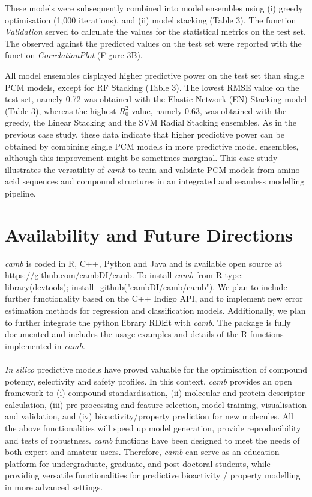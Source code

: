 \documentclass[twoside,a4wide,10pt]{article}
\begin{document}
These models were subsequently combined into model ensembles using
(i) greedy optimisation (1,000 iterations), and (ii) model stacking (Table 3).
The function {\it Validation} served to calculate the values for the statistical metrics on the test set.
The observed against the predicted values on the test set 
were reported with the function {\it CorrelationPlot} (Figure 3B).

All model ensembles displayed higher predictive power on the test set
than single PCM models, except for RF Stacking (Table 3).
The lowest RMSE value on the test set, namely 0.72 was obtained 
with the Elastic Network (EN) Stacking model (Table 3),
whereas the highest $R^{2}_{0}$ value, namely 0.63,
was obtained with the greedy, the Linear Stacking and the SVM Radial Stacking ensembles.
As in the previous case study,
these data indicate that higher predictive power can be obtained by combining 
single PCM models in more predictive model ensembles,
although this improvement might be sometimes marginal.
This case study illustrates the versatility of {\it camb} to train and validate
PCM models from amino acid sequences and compound structures
in an integrated and seamless modelling pipeline.

\section*{Availability and Future Directions}

{\it camb} is coded in R, C++, Python and Java and is available open source
at https://github.com/cambDI/camb.
To install {\it camb} from R type: library(devtools); install\_github("cambDI/camb/camb").
We plan to include further functionality based on the C++ Indigo API,
and to implement new error estimation methods for regression and classification models.
Additionally, we plan to further integrate the python library RDkit with {\it camb}.
The package is fully documented and includes the usage examples and details of the R functions implemented in {\it camb}.\\
\\
{\it In silico} predictive models have proved valuable
for the optimisation of compound potency, selectivity and safety profiles.
In this context, {\it camb} provides an open framework
to (i) compound standardisation, (ii) molecular and protein descriptor calculation,
(iii) pre-processing and feature selection, model training, visualisation and validation, and 
(iv) bioactivity/property prediction for new molecules.
All the above functionalities will speed up model generation, provide reproducibility and tests of robustness.
{\it camb} functions have been designed to meet the needs of both expert and amateur users. 
Therefore, {\it camb} can serve as an education platform for 
undergraduate, graduate, and post-doctoral students,
while providing versatile functionalities for predictive bioactivity / property modelling
in more advanced settings.
\end{document}
